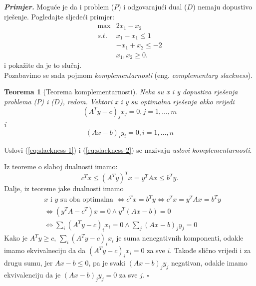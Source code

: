 \documentclass[a4paper, utf8, 11pt, colorlinks]{book}
\newtheorem{thm}{Teorema}
\newenvironment{proof}{{Dokaz:}}{\hfill$\square$}
\begin{document}
\emph{\textbf{Primjer.}} Moguće je da i problem ($P$) i odgovarajući dual ($D$) nemaju dopustivo rješenje. Pogledajte sljedeći primjer:
$$\begin{array}{cc}
    \max                      & 2 x_1 - x_2 \\
     {s.t. }      & x_1 - x_1 \leq 1 \\
                              & -x_1 + x_2 \leq -2 \\
                             & x_1, x_2 \geq 0.
\end{array}$$
i pokažite da je to slučaj.\\

Pozabavimo se sada pojmom \emph{komplementarnosti} (eng. \emph{complementary slackness}). 
\begin{thm}[Teorema komplementarnosti]
      Neka su x i y dopustiva rješenja problema ($P$) i  ($D$), redom. Vektori x i y su optimalna rješenja akko vrijedi 
      \begin{equation}\label{eq:slackness-1}
           (A^Ty - c)_j x_j = 0, j=1,\ldots,m
      \end{equation} i
      \begin{equation}\label{eq:slackness-2}
           (Ax - b)_i y_i = 0, i=1,\ldots,n
      \end{equation}
\end{thm}
Uslovi (\ref{eq:slackness-1}) i (\ref{eq:slackness-2}) se nazivaju \emph{uslovi komplementarnosti}.

\begin{proof}
         Iz teoreme o slaboj dualnosti imamo: 
         \begin{equation}
             c^Tx \leq ( A^T y)^T x = y^T A x \leq b^T y. 
         \end{equation}
         Dalje, iz teoreme jake dualnosti imamo  
         \begin{align*}
             &x \mbox{ i } y \mbox{ su oba optimalna } \Longleftrightarrow c^T x = b^T y \Longleftrightarrow c^Tx = y^TA x = b^Ty \\
             &\Longleftrightarrow (y^T A - c^T) x = 0 \wedge y^T(Ax - b )  = 0\\
             & \Longleftrightarrow \sum_i (A^T y - c)_i x_i = 0 \wedge \sum_j (Ax - b)_j y_j = 0
         \end{align*}
         Kako je $A^Ty \geq c$, $\sum_i (A^T y - c)_i x_i$ je suma nenegativnih komponenti, odakle imamo ekvivalneciju da  da   $(A^T y - c)_i x_i= 0$ za sve $i$. Takođe slično vrijedi i za drugu sumu, jer $Ax - b \leq 0$, pa je svaki  $(Ax - b)_j y_j$ negativan, odakle imamo ekvivalenciju da je $(Ax - b)_j y_j = 0$ za sve $j$.
\end{proof}
\end{document}
